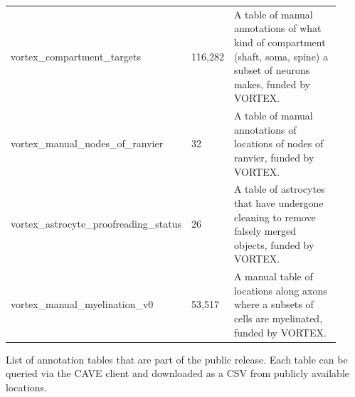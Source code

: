 \documentclass{article}
\begin{document}
{\begin{longtable}{p{0.3\linewidth}p{0.12\linewidth}p{0.5\linewidth}}
vortex\_compartment\_targets & 116,282 & A table of manual annotations of what kind of compartment (shaft, soma, spine) a subset of neurons makes, funded by VORTEX. \\
vortex\_manual\_nodes\_of\_ranvier & 32 & A table of manual annotations of locations of nodes of ranvier, funded by VORTEX. \\
vortex\_astrocyte\_proofreading\_status & 26 & A table of astrocytes that have undergone cleaning to remove falsely merged objects, funded by VORTEX. \\
vortex\_manual\_myelination\_v0 & 53,517 & A manual table of locations along axons where a subsets of cells are myelinated, funded by VORTEX. \\
\bottomrule
\end{longtable}}
\noindent List of annotation tables that are part of the public release. Each table can be queried via the CAVE client and downloaded as a CSV from publicly available locations.
\end{document}
